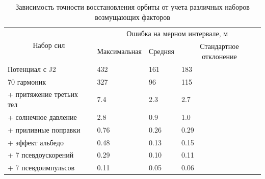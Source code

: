 \begin{table}[h!]
    \centering
    \renewcommand{\arraystretch}{1.5}
    \begin{tabular}{|l|lll|}
    \hline
    \multicolumn{1}{|c|}{\multirow{2}{*}{Набор сил}} & \multicolumn{3}{c|}{Ошибка на мерном интервале, м}                                                             \\ \cline{2-4} 
    \multicolumn{1}{|c|}{}                           & \multicolumn{1}{c|}{Максимальная} & \multicolumn{1}{c|}{Средняя} & \multicolumn{1}{c|}{Стандартное отклонение} \\ \hline
    Потенциал с J2                                   & \multicolumn{1}{l|}{432}          & \multicolumn{1}{l|}{161}     & 183                                         \\ \hline
    70 гармоник                                      & \multicolumn{1}{l|}{327}          & \multicolumn{1}{l|}{96}      & 115                                         \\ \hline
    + притяжение третьих тел                         & \multicolumn{1}{l|}{7.4}          & \multicolumn{1}{l|}{2.3}     & 2.7                                         \\ \hline
    + солнечное давление                             & \multicolumn{1}{l|}{2.8}          & \multicolumn{1}{l|}{0.9}     & 1.0                                         \\ \hline
    + приливные поправки                             & \multicolumn{1}{l|}{0.76}         & \multicolumn{1}{l|}{0.26}    & 0.29                                        \\ \hline
    + эффект альбедо                                 & \multicolumn{1}{l|}{0.48}         & \multicolumn{1}{l|}{0.13}    & 0.15                                        \\ \hline
    + 7 псевдоускорений                              & \multicolumn{1}{l|}{0.29}         & \multicolumn{1}{l|}{0.10}    & 0.11                                        \\ \hline
    + 7 псевдоимпульсов                              & \multicolumn{1}{l|}{0.11}         & \multicolumn{1}{l|}{0.05}    & 0.06                                        \\ \hline
    \end{tabular}
    \caption{Зависимость точности восстановления орбиты от учета различных наборов
    возмущающих факторов}
    \label{tab:lageos2_exp}
\end{table}


